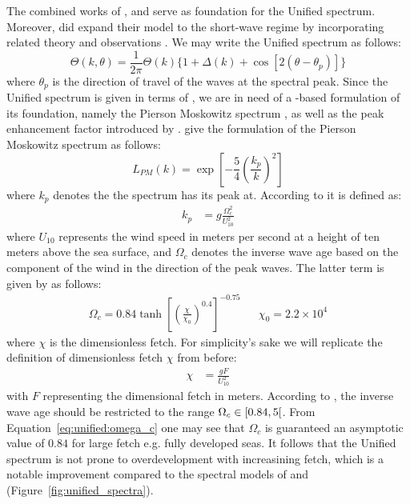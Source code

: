 The combined works of \citet{article:Hasselman1973}, \citet{article:Mitsuyasu1975}
and \citet{article:Donelan1985} serve as foundation for the Unified spectrum. 
Moreover, \citeauthor{article:Elfouhaily1997} did expand their model to the
short-wave regime by incorporating related theory \citep{book:Kitaigorodskii1970,
article:Phillips1985} and observations \citep{article:CoxMunk1954,article:Jaehne1990a,
article:Hara1994}. We may write the Unified spectrum as follows:
%
\begin{equation}
\label{eq:unified:theta}
 \Theta(k, \theta) = \frac{1}{2\pi}\Theta(k)\{1 + \Delta(k) + \cos[2(\theta - \theta_p)]\}
\end{equation}
%
where $\theta_p$ is the direction of travel of the waves at the spectral peak. 
Since the Unified spectrum is given in terms of \wavenumber, we are in need of a 
\wavenumber-based formulation of its foundation, namely the Pierson Moskowitz 
spectrum \citep{article:PiersonMoskowitz1964}, as well as the peak enhancement
factor introduced by \citet{article:Hasselman1973}.
\citeauthor{article:Elfouhaily1997} give the \wavenumber formulation of the
Pierson Moskowitz spectrum as follows:
%
\begin{equation*}
 L_{PM}(k) = \exp\left[-\frac{5}{4} \left(\frac{k_p}{k}\right)^2 \right]
\end{equation*}
where $k_p$ denotes the \wavenumber the spectrum has its peak at.
According to \citeauthor{article:Elfouhaily1997} it is defined as:
\begin{align*}
k_p &= g\frac{\Omega_c^2}{U_{10}^2}
\end{align*}
where $U_{10}$ represents the wind speed in meters per second at a height of ten
meters above the sea surface, and $\Omega_c$ denotes the inverse wave age based
on the component of the wind in the direction of the peak waves.
The latter term is given by \citeauthor{article:Elfouhaily1997} as follows:
\begin{align}
\label{eq:unified:omega_c} \Omega_c = 0.84 \tanh\left[\left(\frac{\chi}{\chi_0}\right)^{0.4}\right]^{-0.75} && \chi_0 = 2.2 \times 10^4
\end{align}
where $\chi$ is the dimensionless fetch. For simplicity's sake we will replicate
the definition of dimensionless fetch $\chi$ from before:
\begin{align*}
 \chi &= \frac{gF}{U_{10}^{2}}
\end{align*}
with $F$ representing the dimensional fetch in meters.
According to \citeauthor{article:Elfouhaily1997}, the inverse wave age
should be restricted to the range $\Omega_c \in \interval[open right]{0.84}{5}$.
From Equation~\ref{eq:unified:omega_c} one may see that $\Omega_c$ is guaranteed
an asymptotic value of $0.84$ for large fetch e.g. fully developed seas.
It follows that the Unified spectrum is not prone to overdevelopment with
increasining fetch, which is a notable improvement 
compared to the spectral models of \citet{article:Hasselman1973}
and \citet{article:Donelan1985} (Figure~\ref{fig:unified_spectra}).

